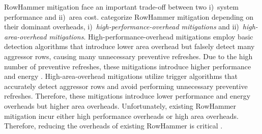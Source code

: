 {RowHammer mitigation  face an important trade-off between two  i)~system performance  and ii)~area cost.  categorize RowHammer mitigation  depending on their dominant overheads, i)~\emph{high-performance-overhead mitigations} and ii)~\emph{high-area-overhead mitigations}.
High-performance-overhead mitigations  employ basic detection algorithms that introduce lower area overhead but falsely detect many aggressor rows, causing many unnecessary preventive refreshes. Due to the high number of preventive refreshes, these mitigations introduce higher performance and energy .
High-area-overhead mitigations  utilize  trigger algorithms that accurately detect aggressor rows and avoid performing unnecessary preventive refreshes. Therefore, these mitigations introduce lower performance and energy overheads but higher area overheads.} 
Unfortunately, existing RowHammer mitigation  incur either high performance  overheads or high area overheads. 
Therefore, reducing the overheads of existing RowHammer  is critical .

